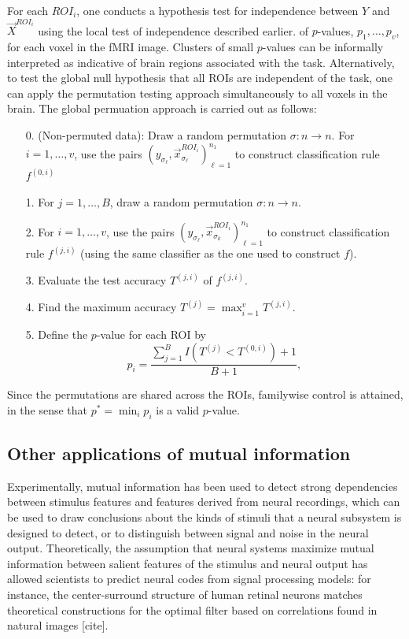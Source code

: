 For each $ROI_i$, one conducts a hypothesis test for independence
between $Y$ and $\vec{X}^{ROI_i}$ using the local test of independence
described earlier.  %
of $p$-values, $p_1,\hdots, p_v$, for each voxel in the fMRI image.
Clusters of small $p$-values can be informally interpreted as
indicative of brain regions associated with the task.  Alternatively,
to test the global null hypothesis that all ROIs are independent of
the task, one can apply the permutation testing approach
simultaneously to all voxels in the brain.  The global permuation
approach is carried out as follows:
\begin{itemize}
\item[0.] (Non-permuted data): Draw a random permutation $\sigma: n \to n$. For $i = 1,\hdots, v$, use the pairs
  $(y_{\sigma_\ell},\vec{x}^{ROI_i}_{\sigma_\ell})_{\ell=1}^{n_1}$ to construct
  classification rule $f^{(0, i)}$
\item[1.] For $j = 1,\hdots, B$, draw a random permutation $\sigma: n \to n$.
\item[2.] For $i = 1,\hdots, v$, use the pairs
  $(y_{\sigma_\ell},\vec{x}^{ROI_i}_{\sigma_k})_{\ell=1}^{n_1}$ to construct
  classification rule $f^{(j, i)}$ (using the same classifier as the one
  used to construct $f$).
\item[3.] Evaluate the test accuracy $T^{(j,i)}$ of $f^{(j, i)}$.
\item[4.] Find the maximum accuracy $T^{(j)} = \max_{i=1}^v T^{(j,i)}$.
\item[5.] Define the $p$-value for each ROI by
\[
p_i =  \frac{\sum_{j=1}^B I(T^{(j)} < T^{(0, i)}) + 1}{B + 1},
\]
\end{itemize}
Since the permutations are shared across the ROIs, familywise control
is attained, in the sense that $p^* = \min_i p_i$ is a valid
$p$-value.

\subsection{Other applications of mutual information}

Experimentally, mutual information has been used to detect strong
dependencies between stimulus features and features derived from
neural recordings, which can be used to draw conclusions about the
kinds of stimuli that a neural subsystem is designed to detect, or to
distinguish between signal and noise in the neural output.
Theoretically, the assumption that neural systems maximize mutual
information between salient features of the stimulus and neural output
has allowed scientists to predict neural codes from signal processing
models: for instance, the center-surround structure of human retinal
neurons matches theoretical constructions for the optimal filter based
on correlations found in natural images [cite].

